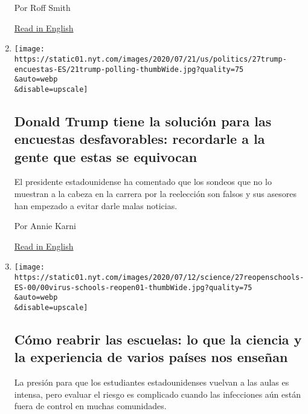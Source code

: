 \begin{enumerate}
  Por Roff Smith

  \href{https://www.nytimes.com/2020/07/20/travel/panama-hats-ecuador.html}{Read
  in English}
\item
  \href{/es/2020/07/27/espanol/estados-unidos/Trump-encuestas-elecciones.html}{}

  \texttt{[image: https://static01.nyt.com/images/2020/07/21/us/politics/27trump-encuestas-ES/21trump-polling-thumbWide.jpg?quality=75\\\&auto=webp\\\&disable=upscale]}

  \hypertarget{donald-trump-tiene-la-soluciuxf3n-para-las-encuestas-desfavorables-recordarle-a-la--gente-que-estas-se-equivocan}{%
  \subsection{Donald Trump tiene la solución para las encuestas
  desfavorables: recordarle a la~ gente que estas se
  equivocan}\label{donald-trump-tiene-la-soluciuxf3n-para-las-encuestas-desfavorables-recordarle-a-la--gente-que-estas-se-equivocan}}

  El presidente estadounidense ha comentado que los sondeos que no lo
  muestran a la cabeza en la carrera por la reelección son falsos y sus
  asesores han empezado a evitar darle malas noticias.

  Por Annie Karni

  \href{https://www.nytimes.com/2020/07/22/us/politics/trump-polls-2020.html}{Read
  in English}
\item
  \href{/es/2020/07/27/espanol/ciencia-y-tecnologia/regreso-a-clases-coronavirus.html}{}

  \texttt{[image: https://static01.nyt.com/images/2020/07/12/science/27reopenschools-ES-00/00virus-schools-reopen01-thumbWide.jpg?quality=75\\\&auto=webp\\\&disable=upscale]}

  \hypertarget{cuxf3mo-reabrir-las-escuelas-lo-que-la-ciencia-y-la-experiencia-de-varios-pauxedses-nos-enseuxf1an}{%
  \subsection{Cómo reabrir las escuelas: lo que la ciencia y la
  experiencia de varios países nos
  enseñan}\label{cuxf3mo-reabrir-las-escuelas-lo-que-la-ciencia-y-la-experiencia-de-varios-pauxedses-nos-enseuxf1an}}

  La presión para que los estudiantes estadounidenses vuelvan a las
  aulas es intensa, pero evaluar el riesgo es complicado cuando las
  infecciones aún están fuera de control en muchas comunidades.


\end{enumerate}
